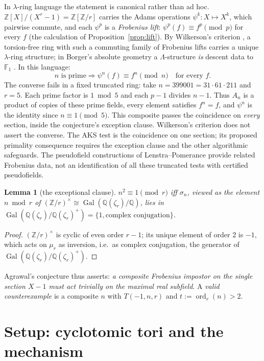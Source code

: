 \documentclass[11pt]{article}
\newtheorem{lemma}[theorem]{Lemma}
\theoremstyle{remark}
\newcommand{\Z}{\mathbb{Z}}
\newcommand{\F}{\mathbb{F}}
\newcommand{\Q}{\mathbb{Q}}
\DeclareMathOperator{\ord}{ord}
\DeclareMathOperator{\Gal}{Gal}
\begin{document}
In $\lambda$-ring language the statement is canonical rather than ad hoc.
$\Z[X]/(X^r - 1) = \Z[\Z/r]$ carries the Adams operations
$\psi^k : X \mapsto X^k$, which pairwise commute, and each $\psi^p$ is a
\emph{Frobenius lift}: $\psi^p(f) \equiv f^p \pmod p$ for every $f$ (the
calculation of Proposition~\ref{prop:lift}). By Wilkerson's criterion
\cite{Wilkerson}, a torsion-free ring with such a commuting family of
Frobenius lifts carries a unique $\lambda$-ring structure; in Borger's
absolute geometry a $\Lambda$-structure \emph{is} descent data to $\F_1$
\cite{Borger}. In this language:
\[
\text{$n$ is prime} \Longrightarrow
\psi^n(f)\equiv f^n\pmod n\quad\text{for every }f.
\]
The converse fails in a fixed truncated ring: take
$n=399001=31\cdot61\cdot211$ and $r=5$. Each prime factor is $1\bmod5$ and
each $p-1$ divides $n-1$. Thus $A_n$ is a product of copies of these prime
fields, every element satisfies $f^n=f$, and $\psi^n$ is the identity since
$n\equiv1\pmod5$. This composite passes the coincidence on \emph{every}
section, inside the conjecture's exception clause. Wilkerson's criterion
does not assert the converse. The AKS test is the coincidence on one section;
its proposed primality consequence requires the exception clause and the
other algorithmic safeguards. The pseudofield constructions of
Lenstra--Pomerance \cite{LPGauss} provide related Frobenius data, not an
identification of all these truncated tests with certified pseudofields.

\begin{lemma}[the exceptional clause]\label{lem:clause}
$n^2 \equiv 1 \pmod r$ iff $\sigma_n$, viewed as the element
$n \bmod r$ of $(\Z/r)^\times \cong \Gal(\Q(\zeta_r)/\Q)$, lies in
$\Gal(\Q(\zeta_r)/\Q(\zeta_r)^+) = \{1, \text{complex conjugation}\}$.
\end{lemma}

\begin{proof}
$(\Z/r)^\times$ is cyclic of even order $r-1$; its unique element of order
$2$ is $-1$, which acts on $\mu_r$ as inversion, i.e.\ as complex
conjugation, the generator of $\Gal(\Q(\zeta_r)/\Q(\zeta_r)^+)$.
\end{proof}

Agrawal's conjecture thus asserts: \emph{a composite Frobenius impostor on
the single section $X-1$ must act trivially on the maximal real subfield}. A
\emph{valid counterexample} is a composite $n$ with $T(-1,n,r)$ and
$t := \ord_r(n) > 2$.

\section{Setup: cyclotomic tori and the mechanism}\label{sec:setup}
\end{document}
